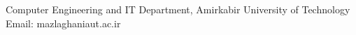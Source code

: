 

\begin{cventries}

{Computer Engineering and IT Department, Amirkabir University of Technology}
{Email: mazlaghaniaut.ac.ir}{}

\end{cventries}

